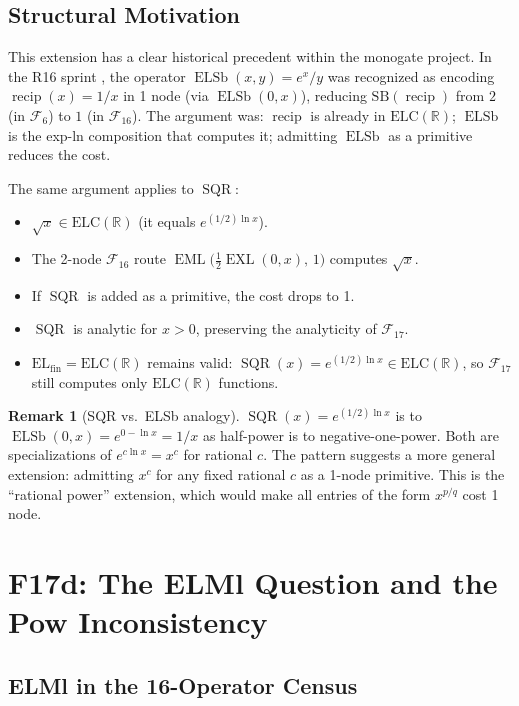 \documentclass[12pt,a4paper]{article}
\theoremstyle{definition}
\newtheorem{remark}[theorem]{Remark}
\theoremstyle{remark}
\newcommand{\EML}{\operatorname{EML}}
\newcommand{\EXL}{\operatorname{EXL}}
\newcommand{\ELSb}{\operatorname{ELSb}}
\newcommand{\recip}{\operatorname{recip}}
\newcommand{\SQR}{\operatorname{SQR}}
\newcommand{\SB}{\mathrm{SB}}
\newcommand{\F}{\mathcal{F}_{16}}
\newcommand{\Fs}{\mathcal{F}_{17}}
\newcommand{\ELC}{\mathrm{ELC}(\mathbb{R})}
\newcommand{\ELfin}{\mathrm{EL}_{\mathrm{fin}}}
\begin{document}
\subsection{Structural Motivation}

This extension has a clear historical precedent within the monogate project.
In the R16 sprint \cite{R16}, the operator $\ELSb(x,y) = e^x/y$ was
recognized as encoding $\recip(x) = 1/x$ in 1 node (via $\ELSb(0,x)$),
reducing $\SB(\recip)$ from $2$ (in $\mathcal{F}_6$) to $1$ (in $\mathcal{F}_{16}$).
The argument was: $\recip$ is already in $\ELC$; $\ELSb$ is the exp-ln
composition that computes it; admitting $\ELSb$ as a primitive reduces the cost.

The same argument applies to $\SQR$:

\begin{itemize}
  \item $\sqrt{x}\in\ELC$ (it equals $e^{(1/2)\ln x}$).
  \item The 2-node $\F$ route $\EML\!\bigl(\tfrac{1}{2}\EXL(0,x),\,1\bigr)$
    computes $\sqrt{x}$.
  \item If $\SQR$ is added as a primitive, the cost drops to 1.
  \item $\SQR$ is analytic for $x>0$, preserving the analyticity of $\Fs$.
  \item $\ELfin = \ELC$ remains valid: $\SQR(x) = e^{(1/2)\ln x}\in\ELC$,
    so $\Fs$ still computes only $\ELC$ functions.
\end{itemize}

\begin{remark}[SQR vs.\ ELSb analogy]
$\SQR(x) = e^{(1/2)\ln x}$ is to $\ELSb(0,x) = e^{0-\ln x} = 1/x$ as
half-power is to negative-one-power.  Both are specializations of
$e^{c\ln x} = x^c$ for rational $c$.  The pattern suggests a more general
extension: admitting $x^c$ for any fixed rational $c$ as a 1-node primitive.
This is the ``rational power'' extension, which would make all entries of the
form $x^{p/q}$ cost 1 node.
\end{remark}

\section{F17d: The ELMl Question and the Pow Inconsistency}
\label{sec:elml}

\subsection{ELMl in the 16-Operator Census}
\end{document}
